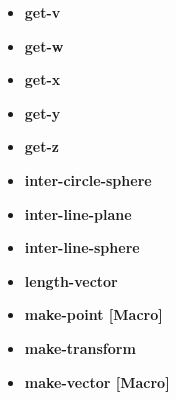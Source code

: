 \documentclass [11pt]{book}
\begin{document}
\begin{itemize}
\item {}
\label{prim:get-v}
\textbf{get-v}





\item {}
\label{prim:get-w}
\textbf{get-w}





\item {}
\label{prim:get-x}
\textbf{get-x}





\item {}
\label{prim:get-y}
\textbf{get-y}





\item {}
\label{prim:get-z}
\textbf{get-z}





\item {}
\label{prim:inter-circle-sphere}
\textbf{inter-circle-sphere}





\item {}
\label{prim:inter-line-plane}
\textbf{inter-line-plane}





\item {}
\label{prim:inter-line-sphere}
\textbf{inter-line-sphere}





\item {}
\label{prim:length-vector}
\textbf{length-vector}





\item {}
\label{prim:make-point}
\textbf{make-point [Macro]}





\item {}
\label{prim:make-transform}
\textbf{make-transform}





\item {}
\label{prim:make-vector}
\textbf{make-vector [Macro]}






\end{itemize}
\end{document}
